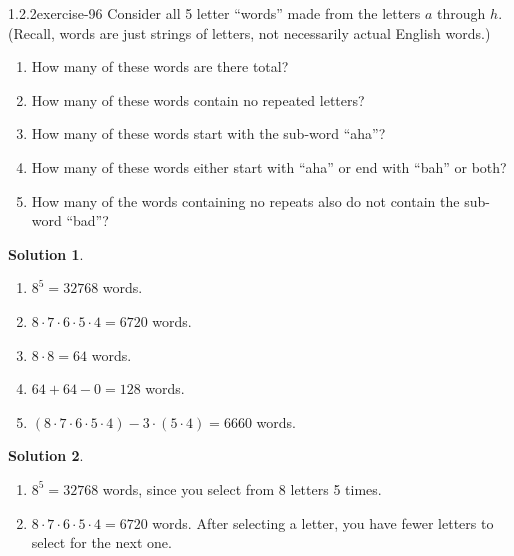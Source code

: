 \documentclass[twoside,11pt,]{book}
\numberwithin{equation}{chapter}
\begin{document}
\begin{divisionsolution}{1.2.2}{}{exercise-96}%
\hypertarget{p-1510}{}%
Consider all 5 letter ``words'' made from the letters \(a\) through \(h\text{.}\) (Recall, words are just strings of letters, not necessarily actual English words.)\leavevmode%
\begin{enumerate}[label=(\alph*)]
\item\hypertarget{li-1067}{}\hypertarget{p-1511}{}%
How many of these words are there total?%
\item\hypertarget{li-1068}{}\hypertarget{p-1513}{}%
How many of these words contain no repeated letters?%
\item\hypertarget{li-1069}{}\hypertarget{p-1515}{}%
How many of these words start with the sub-word ``aha''?%
\item\hypertarget{li-1070}{}\hypertarget{p-1517}{}%
How many of these words either start with ``aha'' or end with ``bah'' or both?%
\item\hypertarget{li-1071}{}\hypertarget{p-1519}{}%
How many of the words containing no repeats also do not contain the sub-word ``bad''?%
\end{enumerate}
%
\par\smallskip%
\noindent\textbf{Solution 1}.\quad%
\hypertarget{p-1521}{}%
\leavevmode%
\begin{enumerate}[label=(\alph*)]
\item\hypertarget{li-1072}{}\hypertarget{p-1522}{}%
\(8^5 = 32768\) words.%
\item\hypertarget{li-1073}{}\hypertarget{p-1523}{}%
\(8\cdot 7\cdot 6\cdot 5\cdot 4 = 6720\) words.%
\item\hypertarget{li-1074}{}\hypertarget{p-1524}{}%
\(8 \cdot 8 =64\) words.%
\item\hypertarget{li-1075}{}\hypertarget{p-1525}{}%
\(64 + 64 - 0 = 128\) words.%
\item\hypertarget{li-1076}{}\hypertarget{p-1526}{}%
\((8\cdot 7\cdot 6\cdot 5\cdot 4) - 3\cdot (5\cdot 4) = 6660\) words.%
\end{enumerate}
%
\par\smallskip%
\noindent\textbf{Solution 2}.\quad%
\hypertarget{p-1527}{}%
\leavevmode%
\begin{enumerate}[label=(\alph*)]
\item\hypertarget{li-1077}{}\hypertarget{p-1528}{}%
\(8^5 = 32768\) words, since you select from 8 letters 5 times.%
\item\hypertarget{li-1078}{}\hypertarget{p-1529}{}%
\(8\cdot 7\cdot 6\cdot 5\cdot 4 = 6720\) words. After selecting a letter, you have fewer letters to select for the next one.%

\end{enumerate}
\end{divisionsolution}
\end{document}
